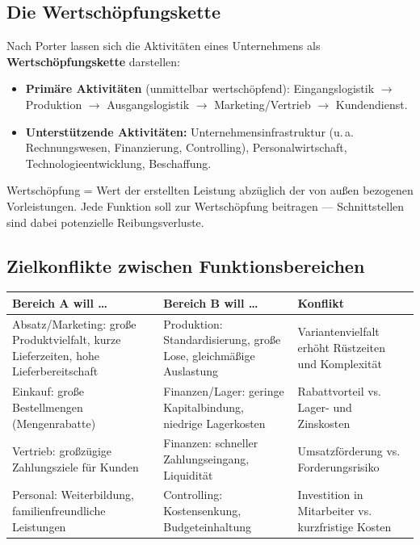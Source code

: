 \documentclass[11pt, a4paper]{article}
\begin{document}
\subsection{Die Wertschöpfungskette}

Nach Porter lassen sich die Aktivitäten eines Unternehmens als
\textbf{Wertschöpfungskette} darstellen:
\begin{itemize}
  \item \textbf{Primäre Aktivitäten} (unmittelbar wertschöpfend): Eingangslogistik
    $\rightarrow$ Produktion $\rightarrow$ Ausgangslogistik $\rightarrow$
    Marketing/Vertrieb $\rightarrow$ Kundendienst.
  \item \textbf{Unterstützende Aktivitäten:} Unternehmensinfrastruktur (u.\,a.
    Rechnungswesen, Finanzierung, Controlling), Personalwirtschaft, Technologieentwicklung,
    Beschaffung.
\end{itemize}
Wertschöpfung = Wert der erstellten Leistung abzüglich der von außen bezogenen
Vorleistungen. Jede Funktion soll zur Wertschöpfung beitragen --- Schnittstellen sind
dabei potenzielle Reibungsverluste.

\subsection{Zielkonflikte zwischen Funktionsbereichen}

\begin{center}
\begin{tabular}{p{4.4cm} p{4.4cm} p{5.0cm}}
\textbf{Bereich A will …} & \textbf{Bereich B will …} & \textbf{Konflikt}\\
\hline
Absatz/Marketing: große Produktvielfalt, kurze Lieferzeiten, hohe Lieferbereitschaft &
Produktion: Standardisierung, große Lose, gleichmäßige Auslastung & Variantenvielfalt
erhöht Rüstzeiten und Komplexität\\
Einkauf: große Bestellmengen (Mengenrabatte) & Finanzen/Lager: geringe Kapitalbindung,
niedrige Lagerkosten & Rabattvorteil vs. Lager- und Zinskosten\\
Vertrieb: großzügige Zahlungsziele für Kunden & Finanzen: schneller Zahlungseingang,
Liquidität & Umsatzförderung vs. Forderungsrisiko\\
Personal: Weiterbildung, familienfreundliche Leistungen & Controlling: Kostensenkung,
Budgeteinhaltung & Investition in Mitarbeiter vs. kurzfristige Kosten\\
\end{tabular}
\end{center}
\end{document}

